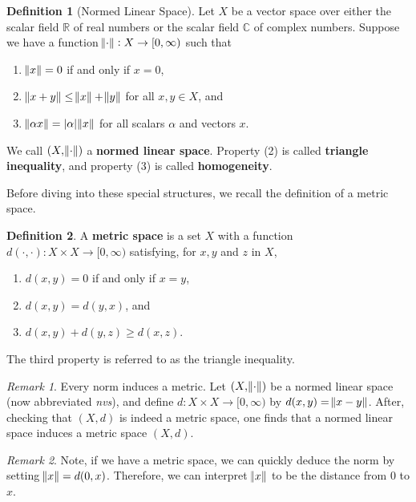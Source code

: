 \documentclass[a4paper, 11pt]{book}
\theoremstyle{definition}
\newtheorem{definition}{Definition}[section]
\theoremstyle{remark}
\newtheorem*{remark}{Remark}
\begin{document}
    \begin{definition}[Normed Linear Space]
        Let $X$ be a vector space over either the scalar field $\mathbb{R}$ of real numbers or the scalar field $\mathbb{C}$ of
        complex numbers. Suppose we have a function $\norm{\cdot}: X \to [0,\infty)$ such that
        \begin{enumerate}
            \item $\norm{x} = 0$ if and only if $x = 0$,
            \item $\norm{x+y} \leq \norm{x} + \norm{y}$ for all $x,y\in X$, and
            \item $\norm{\alpha x} = |\alpha|\norm{x}$ for all scalars $\alpha$ and vectors $x$.
        \end{enumerate}
        We call $(X,\norm{\cdot})$ a \textbf{normed linear space}. Property (2) is called \textbf{triangle inequality}, and property
        (3) is called \textbf{homogeneity}.
    \end{definition}

    Before diving into these special structures, we recall the definition of a metric space.

    \begin{definition}
        A \textbf{metric space} is a set $X$ with a function $d(\cdot,\cdot):X\times X\to [0,\infty)$ satisfying, for $x,y$ and
        $z$ in $X$,
        \begin{enumerate}
            \item $d(x,y) = 0$ if and only if $x=y$,
            \item $d(x,y) = d(y,x)$, and
            \item $d(x,y) + d(y,z) \geq d(x,z)$.
        \end{enumerate}
        The third property is referred to as the triangle inequality.
    \end{definition}

    \begin{remark}
        Every norm induces a metric. Let $(X,\norm{\cdot})$ be a normed linear space (now abbreviated \textit{nvs}), and define
        $d: X\times X \to [0,\infty)$ by $d(x,y) = \norm{x-y}$. After, checking that $(X,d)$ is indeed a metric space, one finds
        that a normed linear space induces a metric space $(X,d)$.
    \end{remark}

    \begin{remark}
        Note, if we have a metric space, we can quickly deduce the norm by setting $\norm{x} = d(0,x)$. Therefore, we can interpret
        $\norm{x}$ to be the distance from 0 to $x$.
    \end{remark}
\end{document}
